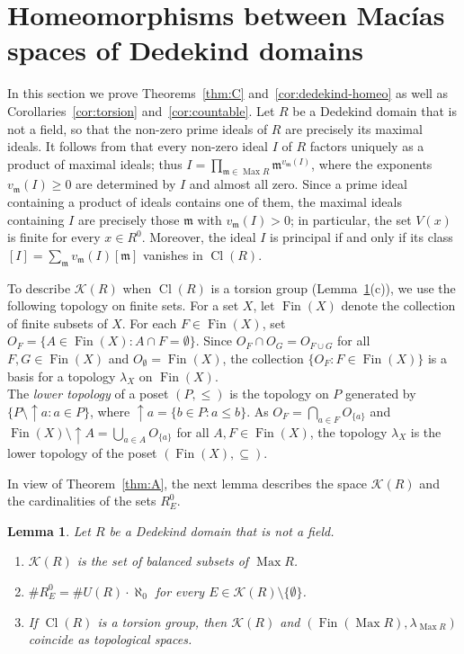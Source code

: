 \documentclass[12pt,reqno,a4paper]{amsart}
\newcommand{\K}{\mathcal{K}}
\newcommand{\m}{\mathfrak{m}}
\DeclareMathOperator{\Max}{Max}
\DeclareMathOperator{\Fin}{Fin}
\DeclareMathOperator{\Cl}{Cl}
\theoremstyle{plain}
\newtheorem{lemma}[theorem]{Lemma}
\theoremstyle{definition}
\begin{document}
\section{Homeomorphisms between Mac\'ias spaces of Dedekind domains}\label{sec:dedekind}
In this section we prove Theorems~\ref{thm:C} and~\ref{cor:dedekind-homeo} as well as Corollaries~\ref{cor:torsion} and~\ref{cor:countable}. Let $R$ be a Dedekind domain that is not a field, so that the non-zero prime ideals of $R$ are precisely its maximal ideals. It follows from \cite[Corollary~9.4]{AtiyahMacdonald} that every non-zero ideal $I$ of $R$ factors uniquely as a product of maximal ideals; thus $I=\prod\limits_{\m\in\Max R}\m^{v_\m(I)}$, where the exponents $v_\m(I)\geq0$ are determined by $I$ and almost all zero. Since a prime ideal containing a product of ideals contains one of them, the maximal ideals containing $I$ are precisely those $\m$ with $v_\m(I)>0$; in particular, the set $V(x)$ is finite for every $x\in R^0$. Moreover, the ideal $I$ is principal if and only if its class $[I]=\sum_{\m}v_\m(I)[\m]$ vanishes in $\Cl(R)$.

To describe $\K(R)$ when $\Cl(R)$ is a torsion group (Lemma~\ref{lem:dedekind}(c)), we use the following topology on finite sets. For a set $X$, let $\Fin(X)$ denote the collection of finite subsets of $X$. For each $F\in\Fin(X)$, set $O_F=\{A\in\Fin(X):A\cap F=\emptyset\}$. Since $O_F\cap O_G=O_{F\cup G}$ for all $F,G\in\Fin(X)$ and $O_\emptyset=\Fin(X)$, the collection $\{O_F:F\in\Fin(X)\}$ is a basis for a topology $\lambda_X$ on $\Fin(X)$.\\
The \emph{lower topology} of a poset $(P,\leq)$ is the topology on $P$ generated by $\{P\setminus{\uparrow}a:a\in P\}$, where ${\uparrow}a=\{b\in P:a\leq b\}$. As $O_F=\bigcap\limits_{a\in F}O_{\{a\}}$ and $\Fin(X)\setminus{\uparrow}A=\bigcup\limits_{a\in A}O_{\{a\}}$ for all $A,F\in\Fin(X)$, the topology $\lambda_X$ is the lower topology of the poset $(\Fin(X),\subseteq)$.

 In view of Theorem~\ref{thm:A}, the next lemma describes the space $\K(R)$ and the cardinalities of the sets $R^0_E$.
\begin{lemma}\label{lem:dedekind}
Let $R$ be a Dedekind domain that is not a field.
\begin{enumerate}[label=\textup{(\alph*)}]
\item $\K(R)$ is the set of balanced subsets of $\Max R$.
\item $\#R^0_E=\#U(R)\cdot\aleph_0$ for every $E\in\K(R)\setminus\{\emptyset\}$.
\item If $\Cl(R)$ is a torsion group, then $\K(R)$ and $(\Fin(\Max R),\lambda_{\Max R})$ coincide as topological spaces.
\end{enumerate}
\end{lemma}
\end{document}
